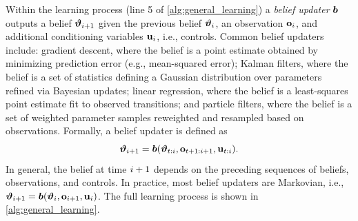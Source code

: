 Within the learning process (line 5 of \cref{alg:general_learning}) a \emph{belief updater} $\boldsymbol{b}$ outputs a belief $\boldsymbol{{\vartheta}}_{i+1}$ given the previous belief $\boldsymbol{{\vartheta}}_i$, an observation $\mathbf{o}_i$, and additional conditioning variables $\mathbf{u}_i$, i.e., controls.
Common belief updaters include: gradient descent, where the belief is a point estimate obtained by minimizing prediction error (e.g., mean-squared error); Kalman filters, where the belief is a set of statistics defining a Gaussian distribution over parameters refined via Bayesian updates; linear regression, where the belief is a least-squares point estimate fit to observed transitions; and particle filters, where the belief is a set of weighted parameter samples reweighted and resampled based on observations.
Formally, a belief updater is defined as 
\begin{equation}
    \boldsymbol{{\vartheta}}_{i+1} = \boldsymbol{b}(\boldsymbol{{\vartheta}}_{t:i}, \mathbf{o}_{t+1:i+1}, \mathbf{u}_{t:i}).
\end{equation}
In general, the belief at time $i+1$ depends on the preceding sequences of beliefs, observations, and controls. 
In practice, most belief updaters are Markovian, i.e., $\boldsymbol{{\vartheta}}_{i+1} = \boldsymbol{b}(\boldsymbol{{\vartheta}}_{i}, \mathbf{o}_{i+1}, \mathbf{u}_{i})$.
The full learning process is shown in \cref{alg:general_learning}.

\begin{algorithm}[ht!]
\SetAlgoLined
\DontPrintSemicolon
\caption{Learning Process $\learningfn$}
\label{alg:general_learning}
{
    \BlankLine
    \BlankLine
}
\end{algorithm}

